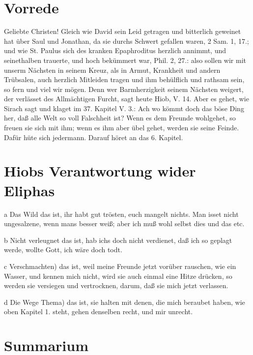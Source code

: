 \section{Vorrede}

Geliebte Christen! Gleich wie David sein Leid getragen und bitterlich geweinet hat über Saul und Jonathan, da sie durchs Schwert gefallen waren, 2 Sam. 1, 17.; und wie St. Paulus sich des kranken Epaphroditus herzlich annimmt, und seinethalben trauerte, und hoch bekümmert war, Phil. 2, 27.: also sollen wir mit unserm Nächsten in seinem Kreuz, als in Armut, Krankheit und andern Trübsalen, auch herzlich Mitleiden tragen und ihm behülflich und rathsam sein, so fern und viel wir mögen. Denn wer Barmherzigkeit seinem Nächsten weigert, der verlässet des Allmächtigen Furcht, sagt heute Hiob, V. 14. Aber es gehet, wie Sirach sagt und klaget im 37. Kapitel V. 3.: Ach wo kömmt doch das böse Ding her, daß alle Welt so voll Falschheit ist? Wenn es dem Freunde wohlgehet, so freuen sie sich mit ihm; wenn es ihm aber übel gehet, werden sie seine Feinde. Dafür hüte sich jedermann. Darauf höret an das 6. Kapitel.

\section{Hiobs Verantwortung wider Eliphas}

a Das Wild das ist, ihr habt gut trösten, euch mangelt nichts. Man isset nicht ungesalzene, wenn mans besser weiß; aber ich muß wohl selbst dies und das etc.

b Nicht verleugnet das ist, hab ichs doch nicht verdienet, daß ich so geplagt werde, wollte Gott, ich wäre doch todt.

c Verschmachten) das ist, weil meine Freunde jetzt vorüber rauschen, wie ein Wasser, und kennen mich nicht, wird sie auch einmal eine Hitze drücken, so werden sie versiegen und vertrocknen, darum, daß sie mich jetzt verlassen.

d Die Wege Thema) das ist, sie halten mit denen, die mich beraubet haben, wie oben Kapitel 1. steht, gehen denselben recht, und mir unrecht.

\section{Summarium}

